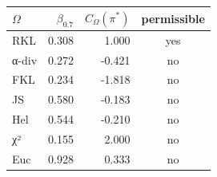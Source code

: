 \begin{tabular}{lrrc}
\toprule
$\Omega$ & $\beta_{0.7}$ & $C_\Omega(\pi^*)$ & permissible \\
\midrule
RKL & 0.308 & 1.000 & yes \\
α-div & 0.272 & -0.421 & no \\
FKL & 0.234 & -1.818 & no \\
JS & 0.580 & -0.183 & no \\
Hel & 0.544 & -0.210 & no \\
χ² & 0.155 & 2.000 & no \\
Euc & 0.928 & 0.333 & no \\
\bottomrule
\end{tabular}
